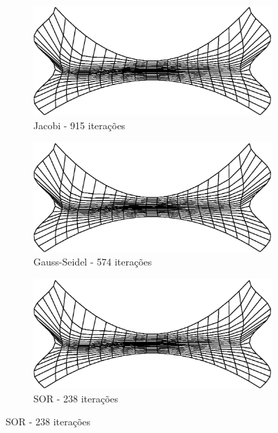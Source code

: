 \documentclass{article}
\begin{document}
		\begin{figure}
		\centering
			\begin{subfigure}[b]{0.45\textwidth}
				\centering
				\includegraphics[width=\textwidth]{figures/waves-ttm-jacobi.eps}
				\caption{Jacobi - 915 iterações}
			\end{subfigure}
			\begin{subfigure}[b]{0.45\textwidth}
				\centering
				\includegraphics[width=\textwidth]{figures/waves-ttm-gauss.eps}
				\caption{Gauss-Seidel - 574 iterações}
			\end{subfigure}
			\begin{subfigure}[b]{0.45\textwidth}
				\centering
				\includegraphics[width=\textwidth]{figures/waves-ttm-sor.eps}
				\caption{SOR - 238 iterações}
			\end{subfigure}

\end{figure}
\end{document}
